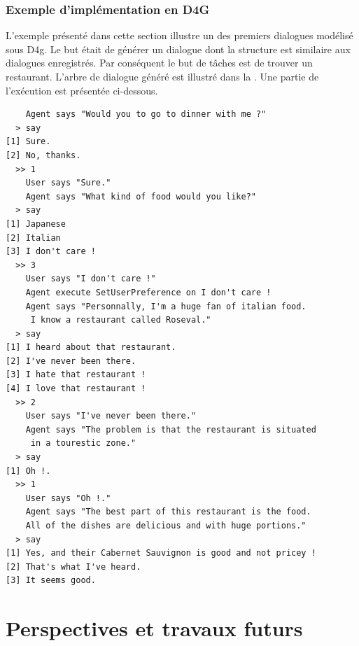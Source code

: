\documentclass[a4paper,french]{article}
\begin{document}
\subsubsection{Exemple d'implémentation en D4G} 
\begin{figure}
	\vskip 8pt
\end{figure}
L'exemple présenté dans cette section illustre un des premiers dialogues modélisé sous D4g. Le but était de générer un dialogue dont la structure est similaire aux dialogues enregistrés. Par conséquent le but de tâches est de trouver un restaurant. L'arbre de dialogue généré est illustré dans la . Une partie de l’exécution est présentée ci-dessous.
\begin{verbatim}
    Agent says "Would you to go to dinner with me ?"
  > say
[1] Sure.
[2] No, thanks.
  >> 1     
    User says "Sure."
    Agent says "What kind of food would you like?"
  > say
[1] Japanese
[2] Italian
[3] I don't care !
  >> 3
    User says "I don't care !"
    Agent execute SetUserPreference on I don't care !
    Agent says "Personnally, I'm a huge fan of italian food.
     I know a restaurant called Roseval."
  > say
[1] I heard about that restaurant.
[2] I've never been there.
[3] I hate that restaurant !
[4] I love that restaurant !
  >> 2
    User says "I've never been there."
    Agent says "The problem is that the restaurant is situated
     in a tourestic zone."
  > say
[1] Oh !.
  >> 1
    User says "Oh !."
    Agent says "The best part of this restaurant is the food. 
    All of the dishes are delicious and with huge portions."
  > say
[1] Yes, and their Cabernet Sauvignon is good and not pricey !
[2] That's what I've heard.
[3] It seems good.
\end{verbatim}


\section{Perspectives et travaux futurs}
\label{pers}
\end{document}
